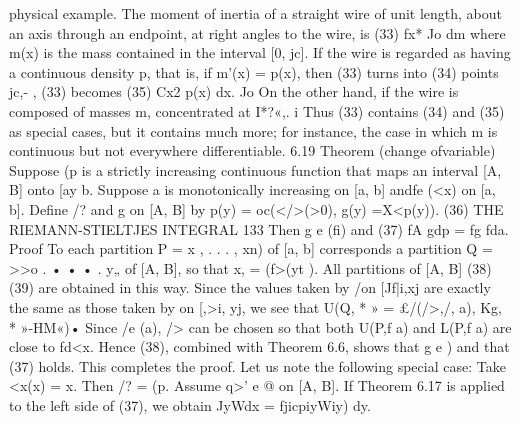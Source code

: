 physical example. The moment of inertia of a straight wire of unit length, about an axis through an endpoint, at right angles to the wire, is (33) fx* Jo dm where m(x) is the mass contained in the interval [0, jc]. If the wire is regarded as having a continuous density p, that is, if m'(x) = p(x), then (33) turns into (34) points jc,- , (33) becomes (35) Cx2 p(x) dx. Jo On the other hand, if the wire is composed of masses m, concentrated at I*?«,. i Thus (33) contains (34) and (35) as special cases, but it contains much more; for instance, the case in which m is continuous but not everywhere differentiable. 6.19 Theorem (change ofvariable) Suppose (p is a strictly increasing continuous function that maps an interval [A, B] onto [ay b. Suppose a is monotonically increasing on [a, b] andfe (<x) on [a, b]. Define /? and g on [A, B] by p(y) = oc(</>(>0), g(y) =X<p(y)). (36) THE RIEMANN-STIELTJES INTEGRAL 133 Then g e (fi) and (37) fA gdp = fg fda. Proof To each partition P = x , . . . , xn) of [a, b] corresponds a partition Q = >>o . • • • . y„ of [A, B], so that x, = (f>(yt ). All partitions of [A, B] (38) (39) are obtained in this way. Since the values taken by /on [Jf|i,xj are exactly the same as those taken by  on [,>i, yj, we see that U(Q, * » = £/(/>,/, a), Kg, * »-HM«)• Since /e (a), /> can be chosen so that both U(P,f a) and L(P,f a) are close to fd<x. Hence (38), combined with Theorem 6.6, shows that g e ) and that (37) holds. This completes the proof. Let us note the following special case: Take <x(x) = x. Then /? = (p. Assume q>' e @ on [A, B]. If Theorem 6.17 is applied to the left side of (37), we obtain JyWdx = fjicpiyWiy) dy.
